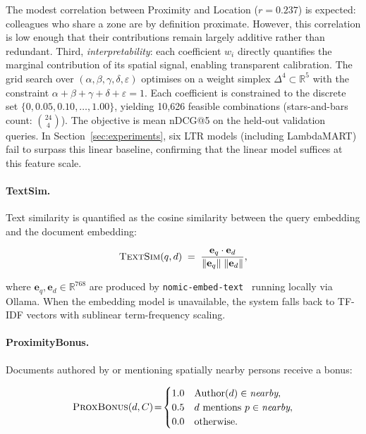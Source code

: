 \documentclass[journal]{IEEEtran}
\begin{document}
The modest correlation between Proximity and Location ($r{=}0.237$)
is expected: colleagues who share a zone are by definition proximate.
However, this correlation is low enough that their contributions
remain largely additive rather than redundant.
Third, \emph{interpretability}: each coefficient $w_i$ directly
quantifies the marginal contribution of its spatial signal,
enabling transparent calibration.
The grid search over
$(\alpha, \beta, \gamma, \delta, \varepsilon)$ optimises on a
weight simplex $\Delta^4 \subset \mathbb{R}^5$ with the constraint
$\alpha + \beta + \gamma + \delta + \varepsilon = 1$.
Each coefficient is constrained to the discrete set
$\{0, 0.05, 0.10, \ldots, 1.00\}$, yielding 10{,}626 feasible
combinations (stars-and-bars count: $\binom{24}{4}$).
The objective is mean nDCG@5 on the held-out validation queries.
In Section~\ref{sec:experiments}, six LTR models (including
LambdaMART) fail to surpass this linear baseline, confirming that
the linear model suffices at this feature scale.

\paragraph{TextSim.}
Text similarity is quantified as the cosine similarity between the
query embedding and the document embedding:

\begin{equation}
  \textsc{TextSim}(q,d) \;=\;
  \frac{\mathbf{e}_q \cdot \mathbf{e}_d}
       {\lVert \mathbf{e}_q \rVert\;\lVert \mathbf{e}_d \rVert},
  \label{eq:textsim}
\end{equation}

\noindent
where $\mathbf{e}_q, \mathbf{e}_d \in \mathbb{R}^{768}$ are produced
by \texttt{nomic-embed-text}~\cite{nomic} running locally
via Ollama.  When the embedding model is unavailable, the system
falls back to TF-IDF vectors with sublinear term-frequency scaling.

\paragraph{ProximityBonus.}
Documents authored by or mentioning spatially nearby persons receive
a bonus:

\begin{equation}
  \textsc{ProxBonus}(d,C) \!=\!
  \begin{cases}
    1.0 & \mathrm{Author}(d) \in \textit{nearby}, \\
    0.5 & d \text{ mentions } p \in \textit{nearby}, \\
    0.0 & \text{otherwise}.
  \end{cases}
  \label{eq:proxbonus}
\end{equation}
\end{document}
